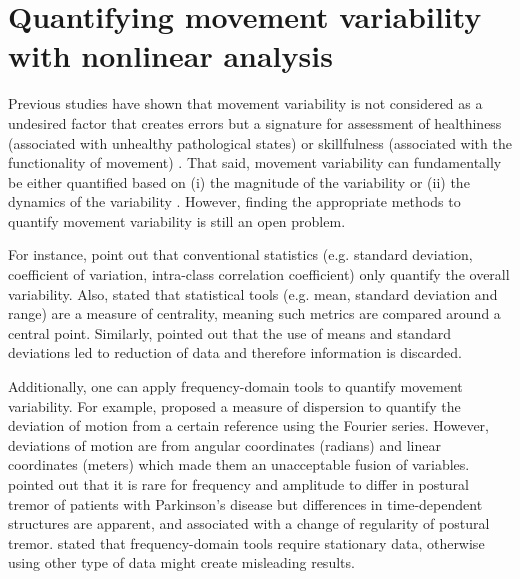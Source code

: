 \section{Quantifying movement variability with nonlinear analysis}
Previous studies have shown that movement variability is not considered 
as a undesired factor that creates errors but a signature for 
assessment of healthiness (associated with unhealthy pathological states) 
or skillfulness (associated with the functionality of movement) 
\citep{stergiou2011}. 
That said, movement variability can fundamentally be either 
quantified based on 
(i) the magnitude of the variability or 
(ii) the dynamics of the variability \citep{caballero2014}. 
However, finding 
the appropriate methods to quantify movement variability is 
still an open problem. 

For instance, \cite{preatoni2010, preatoni2013} point
out that conventional statistics (e.g. standard deviation, coefficient 
of variation, intra-class correlation coefficient) only quantify 
the overall variability.
Also, \cite{stergiou2011} stated that statistical tools 
(e.g. mean, standard deviation and range) are a measure of centrality,
meaning such metrics are compared around a central point. Similarly, 
\cite{coffey2011} pointed out that the use of means and standard deviations 
led to reduction of data and therefore information is discarded.

Additionally, one can apply frequency-domain tools to quantify movement 
variability.
For example, \cite{hatze1986} proposed a measure of dispersion to 
quantify the deviation of motion from a certain reference using the 
Fourier series. However, deviations of motion are from angular coordinates 
(radians) and linear coordinates (meters) which made them an unacceptable 
fusion of variables. 
\cite{vaillancourt2001} pointed out that it is rare for frequency and 
amplitude to differ in postural tremor of patients with Parkinson's disease
but differences in time-dependent structures are apparent, and associated with 
a change of regularity of postural tremor.
\cite{klonowski2002, klonowski2007, klonowski2009} stated that 
frequency-domain tools require stationary data, otherwise using 
other type of data might create misleading results.

